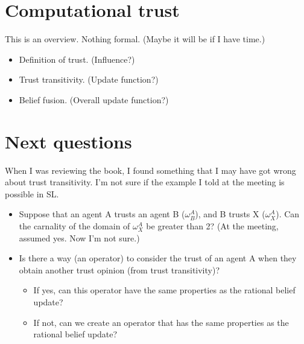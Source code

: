 \documentclass[a4paper,12pt]{article}
\theoremstyle{definition}
\numberwithin{equation}{section}
\begin{document}
%	
%		
%		
%		
%	
%	
%	
%	

\section{Computational trust}

This is an overview. Nothing formal. (Maybe it will be if I have time.)

\begin{itemize}
	\item Definition of trust. (Influence?)
	
	\item Trust transitivity. (Update function?)
	
	\item Belief fusion. (Overall update function?)
\end{itemize}

\section{Next questions}

When I was reviewing the book, I found something that I may have got wrong about trust transitivity. I'm not sure if the example I told at the meeting is possible in SL.

\begin{itemize}
	\item Suppose that an agent A trusts an agent B ($\omega^A_B$), and B trusts X ($\omega^A_X$). Can the carnality of the domain of $\omega^A_X$ be greater than 2? (At the meeting, assumed yes. Now I'm not sure.)
	
	\item Is there a way (an operator) to consider the trust of an agent A when they obtain another trust opinion (from trust transitivity)?
	
	\begin{itemize}
		\item If yes, can this operator have the same properties as the rational belief update?
		
		\item If not, can we create an operator that has the same properties as the rational belief update?
	\end{itemize}
\end{itemize}




\end{document}
